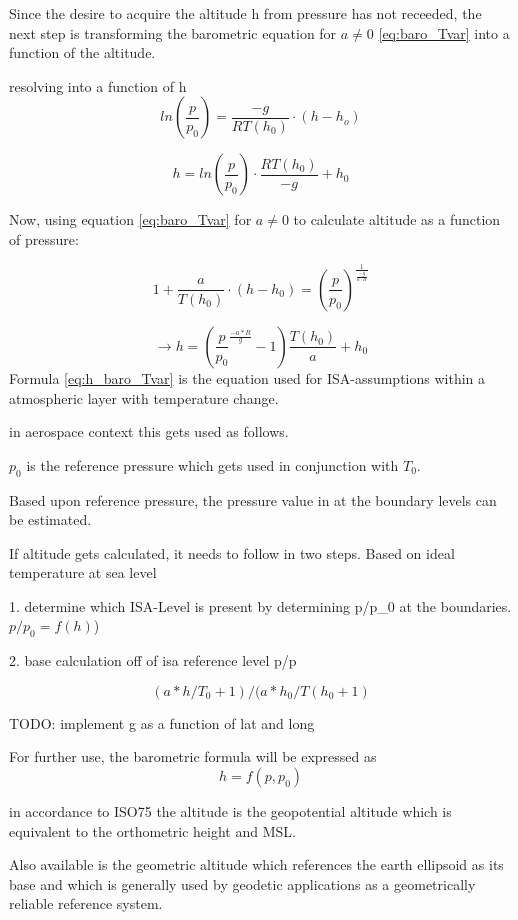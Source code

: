 Since the desire to acquire the altitude h from pressure has not receeded, the next step is transforming the barometric equation for $a\neq0$ \ref{eq:baro_Tvar} into a function of the altitude.

resolving into a function of h
$$ln(\frac{p}{p_0}) =\frac{-g}{RT(h_0)}\cdot(h-h_o) $$

\begin{equation}
    h = ln(\frac{p}{p_0})\cdot \frac{RT(h_0)}{-g}+h_0
    \label{eq:h_baro_Tconst}
\end{equation}


Now, using equation \ref{eq:baro_Tvar} for $a\neq0$ to calculate altitude as a function of pressure:

\[
    1 + \frac{a}{T(h_0)}\cdot (h-h_0) = \left(\frac{p}{p_0}\right)^{\frac{1}{\frac{-g}{a \cdot R}}}
\]

\begin{equation}
    \rightarrow h = \left(\frac{p}{p_0}^{\frac{-a*R}{g}}-1\right)\frac{T(h_0)}{a}+h_0
    \label{eq:h_baro_Tvar}
\end{equation}
Formula \ref{eq:h_baro_Tvar} is the equation used for ISA-assumptions within a atmospheric layer with temperature change.

in aerospace context this gets used as follows.

$p_0$ is the reference pressure which gets used in conjunction with $T_0$.

Based upon reference pressure, the pressure value in at the boundary levels can be estimated.


If altitude gets calculated, it needs to follow in two steps.
Based on ideal temperature at sea level

1. determine which ISA-Level is present by determining p/p_0 at the boundaries.
$p/p_0 = f(h)$)


2. base calculation off of isa reference level
p/p

$$(a*h/T_0+1)/(a*h_0/T(h_0+1)$$


TODO: implement g as a function of lat and long


For further use, the barometric formula will be expressed as  $$h = f(p,p_0)$$

in accordance to ISO75 the altitude is the geopotential altitude which is equivalent to the orthometric height and MSL.

Also available is the geometric altitude which references the earth ellipsoid as its base and which is generally used by geodetic applications as a geometrically reliable reference system.



